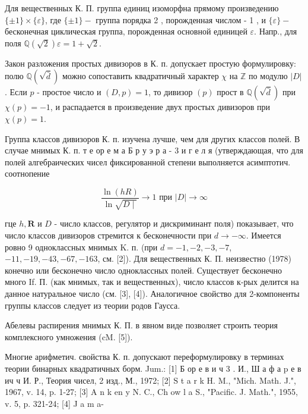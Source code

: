 \documentclass[10pt]{article}
\begin{document}
Для вещественных К. П. группа единиц изоморфна прямому произведению $\{ \pm 1\} \times\{\varepsilon\}$, где $\{ \pm 1\}-$ группа порядка 2 , порожденная числом - 1 , и $\{\varepsilon\}-$ бесконечная циклическая группа, порожденная основной единицей $\varepsilon$. Напр., для поля $\mathbb{Q}(\sqrt{2}) \varepsilon=1+\sqrt{2}$.



Закон разложения простых дивизоров в К. п. допускает простую формулировку: полю $\mathbb{Q}(\sqrt{\bar{d}})$ можно сопоставить квадратичный характер $\chi$ на $\mathbb{Z}$ по модулю $|D|$. Если $p$ - простое число и $(D, p)=1$, то дивизор $(p)$ прост в $\mathbb{Q}(\sqrt{\bar{d}})$ при $\chi(p)=-1$, и распадается в произведение двух простых дивизоров при $\chi(p)=1$.



Группа классов дивизоров К. п. изучена лучше, чем для других классов полей. В случае мнимых К. п. т е ор е м а Б р у э р а - 3 и г е л я (утверждающая, что для полей алгебраических чисел фиксированной степени выполняется асимптотич. соотнопение



\[

\frac{\ln (h R)}{\ln \sqrt{D \mid}} \rightarrow 1 \text { при }|D| \rightarrow \infty

\]



гце $h, \boldsymbol{R}$ и $D$ - число классов, регулятор и дискриминант поля) показывает, что число классов дивизоров стремится к бесконечности при $d \rightarrow-\infty$. Имеется ровно 9 одноклассных мнимых $\mathrm{K}$. п. (при $d=-1,-2,-3,-7$, $-11,-19,-43,-67,-163$, см. [2]). Для вещественных К. П. неизвестно (1978) конечно или бесконечно число одноклассных полей. Существует бесконечно много If. П. (как мнимых, так и вещественных), число классов к-рых делится на данное натуральное число (см. [3], [4]). Аналогичное свойство для 2-компоненты группы классов следует из теории родов Гаусса.



Абелевы распирения мнимых К. П. в явном виде позволяет строить теория комплексного умножения (cM. [5]).



Многие арифметич. свойства К. п. допускают переформулировку в терминах теории бинарных квадратичных борм. Jum.: [1] Б ор е в и ч 3 . И., Ш а ф а p е в ич ч И. Р., Теория чисел, 2 изд., М., 1972; [2] $\mathrm{S}$ t a r k H. M., "Mich. Math. J.", 1967, v. 14, p. 1-27; [3] A n k en y N. C., $\mathrm{Ch}$ ow l a S., "Pacific. J. Math.", 1955, v. 5, p. 321-24; [4] J a m a-
\end{document}

